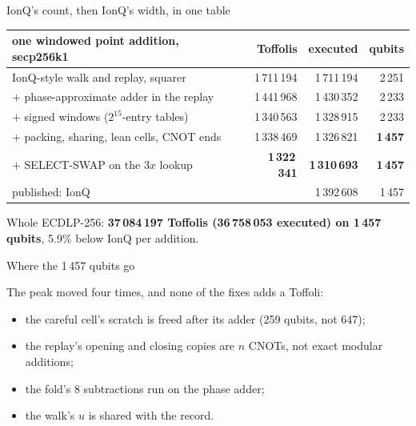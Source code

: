 \documentclass[aspectratio=169,11pt]{beamer}
\begin{document}
\begin{frame}{IonQ's count, then IonQ's width, in one table}
  \centering\small
  \renewcommand{\arraystretch}{1.15}
  \begin{tabular}{@{}lrrr@{}}
    \toprule
    one windowed point addition, secp256k1 & Toffolis & executed & qubits \\
    \midrule
    IonQ-style walk and replay, squarer & 1\,711\,194 & 1\,711\,194 & 2\,251 \\
    $+$ phase-approximate adder in the replay & 1\,441\,968 & 1\,430\,352 & 2\,233 \\
    $+$ signed windows ($2^{15}$-entry tables) & 1\,340\,563 & 1\,328\,915 & 2\,233 \\
    $+$ packing, sharing, lean cells, CNOT ends & 1\,338\,469 & 1\,326\,821 & \textbf{1\,457} \\
    $+$ SELECT-SWAP on the $3x$ lookup & \textbf{1\,322\,341} & \textbf{1\,310\,693} & \textbf{1\,457} \\
    \midrule
    published: IonQ & & 1\,392\,608 & 1\,457 \\
    \bottomrule
  \end{tabular}
  \begin{takeaway}Whole ECDLP-256: \textbf{37\,084\,197 Toffolis (36\,758\,053 executed) on 1\,457 qubits}, 5.9\% below IonQ per addition.\end{takeaway}
\end{frame}

\begin{frame}{Where the 1\,457 qubits go}
  \centering
  \vskip3mm
  \raggedright
  The peak moved four times, and none of the fixes adds a Toffoli:
  \begin{itemize}
    \item the careful cell's scratch is freed after its adder (259 qubits, not 647);
    \item the replay's opening and closing copies are $n$ CNOTs, not exact modular additions;
    \item the fold's 8 subtractions run on the phase adder;
    \item the walk's $u$ is shared with the record.
  \end{itemize}
\end{frame}
\end{document}
